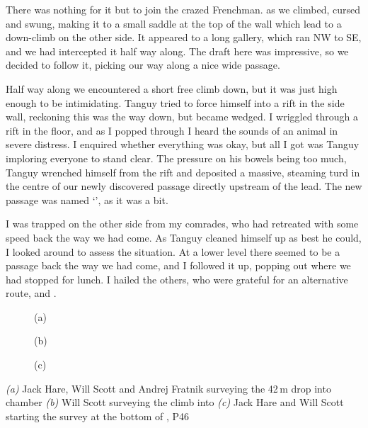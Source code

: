 There was nothing for it but to join the crazed Frenchman.  as we climbed, cursed and swung, making it to a small saddle at the top of the wall which lead to a down-climb on the other side. It appeared to a long gallery, which ran NW to SE, and we had intercepted it half way along. The draft here was impressive, so we decided to follow it, picking our way along a nice wide passage.
 
Half way along we encountered a short free climb down, but it was just high enough to be intimidating. Tanguy tried to force himself into a rift in the side wall, reckoning this was the way down, but became wedged. I wriggled through a rift in the floor, and as I popped through I heard the sounds of an animal in severe distress. I enquired whether everything was okay, but all I got was Tanguy imploring everyone to stand clear. The pressure on his bowels being too much, Tanguy wrenched himself from the rift and deposited a massive, steaming turd in the centre of our newly discovered passage directly upstream of the lead. The new passage was named `', as it was a bit.
 
I was trapped on the other side from my comrades, who had retreated with some speed back the way we had come. As Tanguy cleaned himself up as best he could, I looked around to assess the situation. At a lower level there seemed to be a passage back the way we had come, and I followed it up, popping out where we had stopped for lunch. I hailed the others, who were grateful for an alternative route, and .

\begin{pagefigure}
    \centering
    \begin{subfigure}[t]{0.393\textwidth}
        \centering
        \caption{(a)} \label{fig:hotmk2}
    \end{subfigure}
    \hfill
    \begin{subfigure}[t]{0.59\textwidth}
        \centering
        \caption{(b)} \label{Colony}
    \end{subfigure}

    \vspace{0.3cm}
    \begin{subfigure}[t]{\textwidth}
    \centering
        \caption{(c)} \label{Bottom of Blue Danube}
    \end{subfigure}
    
    \caption{
    \textit{(a)} Jack Hare, Will Scott and Andrej Fratnik surveying the 42\,m drop into \protect{} chamber
    \textit{(b)} Will Scott surveying the climb into \protect{}
    \textit{(c)} Jack Hare and Will Scott starting the survey at the bottom of \protect{}, P46 }

\end{pagefigure}


